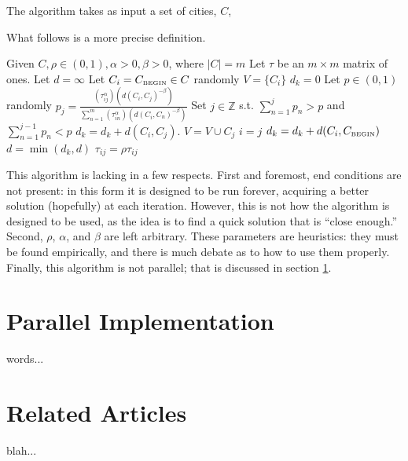 \documentclass[twocolumn]{article}
\begin{document}
The algorithm takes as input a set of cities, $C$, 

What follows is a more precise definition. \\

\begin{algorithmic}
  \State Given $C, \rho \in (0,1), \alpha > 0, \beta > 0$, where $|C| = m$
  \State Let $\tau$ be an $m \times m$ matrix of ones.
  \State Let $d = \infty$
    \State Let $C_i = C_{\mbox{{\tiny BEGIN}}}\in C$ randomly
    \State $V = \{ C_i \}$
    \State $d_k = 0$
       \State Let $p \in (0,1)$ randomly
       \State $\displaystyle p_j = \frac{(\tau_{ij}^\alpha)(d(C_i,C_j)^{-\beta})}{\sum_{n=1}^m 
         (\tau_{in}^\alpha) (d(C_i,C_n)^{-\beta})}$
       \State Set $j \in \mathbb{Z}$ s.t. $\displaystyle \sum_{n=1}^j p_n > p$ and $\displaystyle \sum_{n=1}^{j-1} p_n < p$
       \State $d_k = d_k + d(C_i,C_j)$.
       \State $V = V \cup C_j$
       \State $i = j$
    \EndWhile
    \State $d_k = d_k + d(C_i,C_{\mbox{{\tiny BEGIN}}})$
    \State $d = \min (d_k, d)$
    \State $\tau_{ij} = \rho \tau_{ij}$
  \EndFor \\
\end{algorithmic}

This algorithm is lacking in a few respects. First and foremost, end conditions are not present:
in this form it is designed to be run forever, acquiring a better solution (hopefully) at each
iteration. However, this is not how the algorithm is designed to be used, as the idea is to find
a quick solution that is ``close enough.'' Second, $\rho$, $\alpha$, and $\beta$ are left 
arbitrary. These parameters are heuristics: they must be found empirically, and there is much 
debate as to how to use them properly. Finally, this algorithm is not parallel; that is 
discussed in section \ref{sec:parallel}.


\section{Parallel Implementation} \label{sec:parallel}

words...\\


\section{Related Articles}

blah...\\
\end{document}
